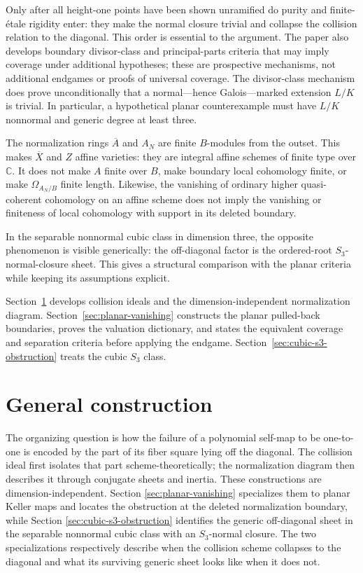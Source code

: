 \documentclass[11pt]{article}
\theoremstyle{remark}
\theoremstyle{definition}
\newcommand{\C}{\mathbb C}
\begin{document}
Only after all height-one points have been shown unramified do purity and
finite-\'etale rigidity enter: they make the normal closure trivial and
collapse the collision relation to the diagonal.  This order is essential
to the argument.  The paper also develops boundary divisor-class and
principal-parts criteria that may imply coverage under additional
hypotheses; these are prospective mechanisms, not additional endgames or
proofs of universal coverage.
The divisor-class mechanism does prove unconditionally that a normal---hence
Galois---marked extension \(L/K\) is trivial.  In particular, a hypothetical
planar counterexample must have \(L/K\) nonnormal and generic degree at least
three.

The normalization rings \(\overline A\) and \(A_N\) are finite
\(B\)-modules from the outset.  This makes \(\overline X\) and \(Z\)
affine varieties: they are integral affine schemes of finite type over
\(\C\).  It does not make \(A\) finite over \(B\), make boundary local
cohomology finite, or make \(\Omega_{A_N/B}\) finite length.  Likewise,
the vanishing of ordinary higher quasi-coherent cohomology on an affine
scheme does not imply the vanishing or finiteness of local cohomology with
support in its deleted boundary.

In the separable nonnormal cubic class in dimension three, the opposite
phenomenon is visible generically: the off-diagonal factor is the
ordered-root \(S_3\)-normal-closure sheet.  This gives a structural
comparison with the planar criteria while keeping its assumptions explicit.

Section~\ref{sec:general-construction} develops collision ideals and the
dimension-independent normalization diagram.
Section~\ref{sec:planar-vanishing} constructs the planar pulled-back
boundaries, proves the valuation dictionary, and states the equivalent
coverage and separation criteria before applying the endgame.
Section~\ref{sec:cubic-s3-obstruction} treats the cubic \(S_3\) class.

\section{General construction}
\label{sec:general-construction}

The organizing question is how the failure of a polynomial self-map to be
one-to-one is encoded by the part of its fiber square lying off the diagonal.
The collision ideal first isolates that part scheme-theoretically; the
normalization diagram then describes it through conjugate sheets and inertia.
These constructions are dimension-independent.  Section
\ref{sec:planar-vanishing} specializes them to planar Keller maps and locates
the obstruction at the deleted normalization boundary, while Section
\ref{sec:cubic-s3-obstruction} identifies the generic off-diagonal sheet in
the separable nonnormal cubic class with an \(S_3\)-normal closure.  The two
specializations respectively describe when the collision scheme collapses to
the diagonal and what its surviving generic sheet looks like when it does not.
\end{document}
